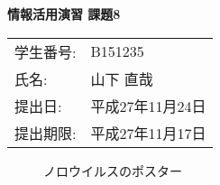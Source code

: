 \topmargin=-1.5cm
\textwidth=17cm
\textheight=25cm
\oddsidemargin=-0.5cm
\evensidemargin=-0.5cm


\begin{center}
  \Large\bf 情報活用演習 課題8
\end{center}

\begin{flushright}
  \begin{tabular}{ll}
    学生番号: & B151235 \\
    氏名:     & 山下 直哉 \\
    提出日:   & 平成27年11月24日 \\
    提出期限: & 平成27年11月17日 \\
  \end{tabular}
\end{flushright}

\begin{figure}[htb]
\begin{center}
\caption{ノロウイルスのポスター}
\end{center}
\end{figure}


